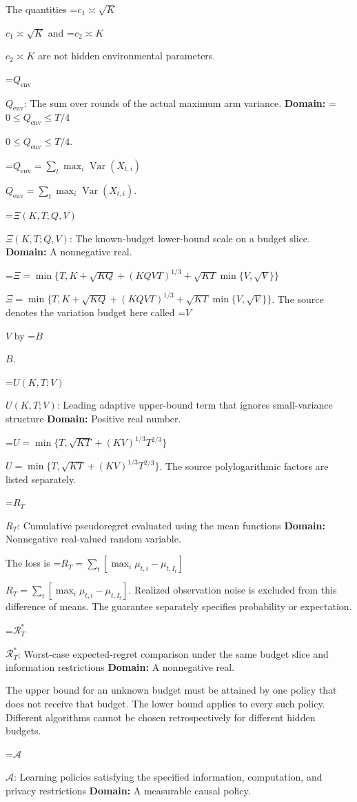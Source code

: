 \documentclass[10pt,a4paper]{article}
\newcommand{\AtlasMath}[1]{\par\begingroup\centering\setbox0=\hbox{$\displaystyle #1$}\ifdim\wd0>1.4\linewidth\typeout{ATLAS WIDE FORMULA: \the\wd0}\fi\ifdim\wd0>\linewidth\resizebox{\linewidth}{!}{\box0}\else\box0\fi\par\endgroup}
\newcommand{\AtlasInlineMath}[1]{\begingroup\setbox0=\hbox{$#1$}\ifdim\wd0>.4\linewidth\endgroup\AtlasMath{#1}\else\endgroup$#1$\fi}
\begin{document}
The quantities \AtlasInlineMath{c_1\asymp\sqrt K} and \AtlasInlineMath{c_2\asymp K} are not hidden environmental parameters.



\AtlasInlineMath{Q_{\mathrm{env}}}: The sum over rounds of the actual maximum arm variance. \textbf{Domain:} \AtlasInlineMath{0\le Q_{\mathrm{env}}\le T/4}.



\AtlasInlineMath{Q_{\mathrm{env}}=\sum_t\max_i\operatorname{Var}(X_{t,i})}.



\AtlasInlineMath{\Xi(K,T;Q,V)}: The known-budget lower-bound scale on a budget slice. \textbf{Domain:} A nonnegative real.



\AtlasInlineMath{\Xi=\min\{T,K+\sqrt{KQ}+(KQVT)^{1/3}+\sqrt{KT}\min\{V,\sqrt V\}\}}. The source denotes the variation budget here called \AtlasInlineMath{V} by \AtlasInlineMath{B}.



\AtlasInlineMath{U(K,T;V)}: Leading adaptive upper-bound term that ignores small-variance structure \textbf{Domain:} Positive real number.



\AtlasInlineMath{U=\min\{T,\sqrt{KT}+(KV)^{1/3}T^{2/3}\}}. The source polylogarithmic factors are listed separately.



\AtlasInlineMath{R_T}: Cumulative pseudoregret evaluated using the mean functions \textbf{Domain:} Nonnegative real-valued random variable.



The loss is \AtlasInlineMath{R_T=\sum_t[\max_i\mu_{t,i}-\mu_{t,I_t}]}. Realized observation noise is excluded from this difference of means. The guarantee separately specifies probability or expectation.



\AtlasInlineMath{\mathcal R_T^*}: Worst-case expected-regret comparison under the same budget slice and information restrictions \textbf{Domain:} A nonnegative real.



The upper bound for an unknown budget must be attained by one policy that does not receive that budget. The lower bound applies to every such policy. Different algorithms cannot be chosen retrospectively for different hidden budgets.



\AtlasInlineMath{\mathcal A}: Learning policies satisfying the specified information, computation, and privacy restrictions \textbf{Domain:} A measurable causal policy.
\end{document}
